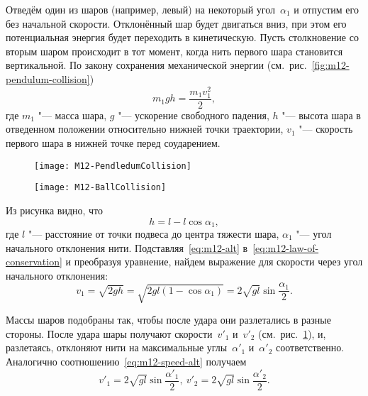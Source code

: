 \documentclass[a4paper, 12pt]{extarticle}
\begin{document}
Отведём один из шаров (например, левый) на  некоторый угол~$\alpha_1$ и отпустим его без начальной скорости. Отклонённый шар будет двигаться  вниз, при этом его потенциальная энергия будет переходить в кинетическую. Пусть столкновение со вторым шаром происходит в тот момент, когда нить первого шара становится вертикальной. По закону сохранения механической энергии (см.~рис.~\ref{fig:m12-pendulum-collision}) %
\begin{equation}
\label{eq:m12-law-of-conservation}
m_1 g h = \frac{m_1 v_1^2}{2},
\end{equation}
где $m_1$ "--- масса шара, $g$ "--- ускорение свободного падения, $h$ "--- высота шара в отведенном  положении относительно нижней точки траектории, $v_1$ "--- скорость первого шара в нижней точке перед соударением. %
\begin{figure}[h]
\centering
\begin{minipage}[b]{0.45\linewidth}
\centering
\texttt{[image: M12-PendledumCollision]}
\caption{\label{fig:m12-pendulum-collision}}
\end{minipage} \hfill
\begin{minipage}[b]{0.45\linewidth}
\centering
\texttt{[image: M12-BallCollision]}
\caption{\label{fig:m12-ball-collision}}
\end{minipage}
\end{figure}
Из рисунка видно, что
\begin{equation}
\label{eq:m12-alt}
h = l - l \cos \alpha_1,
\end{equation}
где $l$ "--- расстояние от точки подвеса до центра тяжести шара, $\alpha_1$ "--- угол начального отклонения нити. Подставляя~\eqref{eq:m12-alt} в~\eqref{eq:m12-law-of-conservation} и преобразуя уравнение, найдем выражение для скорости через угол начального отклонения: %
\begin{equation}
\label{eq:m12-speed-alt}
v_1 = \sqrt{2gh} = \sqrt{2gl(1 - \cos \alpha_1)} = 2\sqrt{gl}\sin \frac{\alpha_1}{2}.
\end{equation}

Массы шаров подобраны так, чтобы после удара они разлетались в разные стороны. После удара шары получают скорости~$v'_1$  и~$v'_2$  (см.~рис.~\ref{fig:m12-ball-collision}), и, разлетаясь, отклоняют нити на максимальные углы~$\alpha'_1$ и~$\alpha'_2$ соответственно. Аналогично соотношению~\eqref{eq:m12-speed-alt} получаем
\begin{equation}
\label{eq:m12-final-speed}
v'_1 = 2 \sqrt{gl} \sin \frac{\alpha'_1}{2}, \ v'_2 = 2 \sqrt{gl} \sin \frac{\alpha'_2}{2}.
\end{equation}
\end{document}
